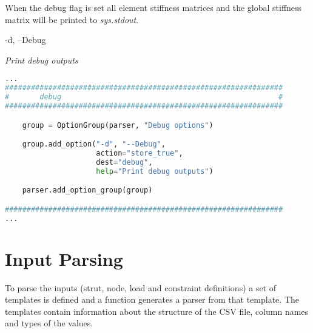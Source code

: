 When the debug flag is set all element stiffness matrices and the global stiffness matrix will be printed to \textit{sys.stdout}.

\vspace{2em}
\begin{addmargin}[2em]{1em}
-d, --Debug

\textit{Print debug outputs}
\end{addmargin}
\vspace{2em}

\begin{inconsolata}
\begin{minipage}{\linewidth}
\begin{lstlisting}[language=python]
...
################################################################
#       debug                                                  #
################################################################

    group = OptionGroup(parser, "Debug options")

    group.add_option("-d", "--Debug",
                     action="store_true",
                     dest="debug",
                     help="Print debug outputs")

    parser.add_option_group(group)

################################################################
...
\end{lstlisting}
\end{minipage}
\end{inconsolata}


\section{Input Parsing}
\label{sec:inputpars}

To parse the inputs (strut, node, load and constraint definitions) a set of templates is defined and a function generates a parser from that template.
The templates contain information about the structure of the CSV file, column names and types of the values.

